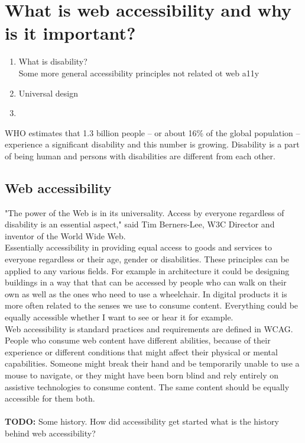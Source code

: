 \documentclass{master_thesis_section}
\begin{document}
\section{What is web accessibility and why is it important?}

\begin{enumerate}
	\item What is disability? \\
	Some more general accessibility principles not related ot web a11y
	\item Universal design
	\item
\end{enumerate}

WHO estimates that 1.3 billion people – or about 16\% of the global population – experience a significant disability and this number is growing. Disability is a part of being human and persons with disabilities are different from each other. \citep{WHODisability2022}

\subsection{Web accessibility}
"The power of the Web is in its universality. Access by everyone regardless of disability is an essential aspect," said Tim Berners-Lee, W3C Director and inventor of the World Wide Web\citep{WWWC1997}. \\
Essentially accessibility in providing equal access to goods and services to everyone regardless or their age, gender or disabilities. These principles can be applied to any various fields. For example in architecture it could be designing buildings in a way that that can be accessed by people who can walk on their own as well as the ones who need to use a wheelchair. In digital products it is more often related to the senses we use to consume content. Everything could be equally accessible whether I want to see or hear it for example. \\
Web accessibility is standard practices and requirements are defined in WCAG. People who consume web content have different abilities, because of their experience or different conditions that might affect their physical or mental capabilities. Someone might break their hand and be temporarily unable to use a mouse to navigate, or they might have been born blind and rely entirely on assistive technologies to consume content. The same content should be equally accessible for them both.
\\ \\ \textbf{TODO:} Some history. How did accessibility get started what is the history behind web accessibility?
\end{document}
